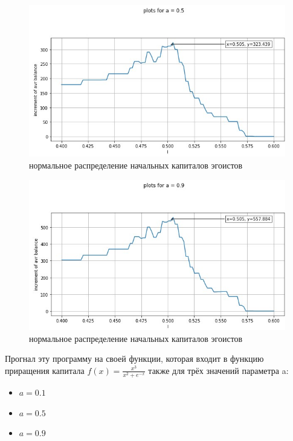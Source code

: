 \documentclass{article}
\begin{document}
\begin{figure}[H]
	\centering
	\includegraphics[width=0.8\linewidth]{assets/plot_a05_mu_positive.jpg}
	\caption{нормальное распределение начальных капиталов эгоистов}
	\label{fig:mpr}
\end{figure}
\begin{figure}[H]
	\centering
	\includegraphics[width=0.8\linewidth]{assets/plot_a09_mu_positive.jpg}
	\caption{нормальное распределение начальных капиталов эгоистов}
	\label{fig:mpr}
\end{figure}
\null\newpage
Прогнал эту программу на своей функции, которая входит в функцию приращения капитала $f(x) = \frac{x^3}{x^2 + e^{-x}}$ также для трёх значений параметра a:
\begin{itemize}
	\item $a = 0.1$
	\item $a = 0.5$
	\item $a = 0.9$ 
\end{itemize}
\end{document}
